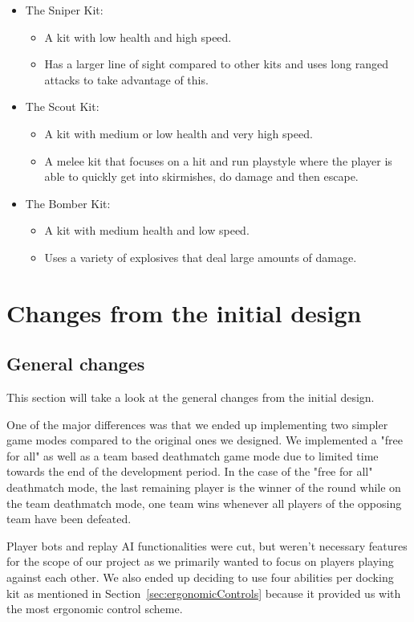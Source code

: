 \begin{itemize}
    \item The Sniper Kit:
    \begin{itemize}
        \item A kit with low health and high speed. 
        \item Has a larger line of sight compared to other kits and uses long ranged attacks to take advantage of this. 
    \end{itemize}
    
    \item The Scout Kit:
    \begin{itemize}
        \item A kit with medium or low health and very high speed. 
        \item A melee kit that focuses on a hit and run playstyle where the player is able to quickly get into skirmishes, do damage and then escape. 
    \end{itemize}
    
    \item The Bomber Kit:
    \begin{itemize}
        \item A kit with medium health and low speed.
        \item Uses a variety of explosives that deal large amounts of damage.
    \end{itemize}
\end{itemize}

\section{Changes from the initial design}
\subsection{General changes}
This section will take a look at the general changes from the initial design. 

One of the major differences was that we ended up implementing two simpler game modes compared to the original ones we designed. We implemented a "free for all" as well as a team based deathmatch game mode due to limited time towards the end of the development period. In the case of the "free for all" deathmatch mode, the last remaining player is the winner of the round while on the team deathmatch mode, one team wins whenever all players of the opposing team have been defeated. 

Player bots and replay AI functionalities were cut, but weren't necessary features for the scope of our project as we primarily wanted to focus on players playing against each other. We also ended up deciding to use four abilities per docking kit as mentioned in Section~\ref{sec:ergonomicControls} because it provided us with the most ergonomic control scheme.
    
